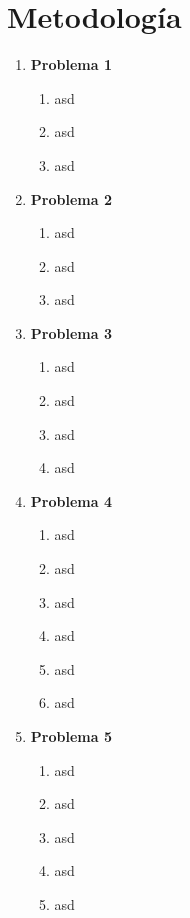 \documentclass[letterpaper, titlepage]{article}
\begin{document}
\section{Metodología}
	\begin{enumerate}
		\item \textbf{Problema 1}
		\begin{enumerate}
			\item asd
			\item asd
			\item asd
		\end{enumerate}
		
		\item \textbf{Problema 2}
		\begin{enumerate}
			\item asd
			\item asd
			\item asd
		\end{enumerate}
		
		\item \textbf{Problema 3}
		\begin{enumerate}
			\item asd
			\item asd
			\item asd
			\item asd
		\end{enumerate}
		
		\item \textbf{Problema 4}
		\begin{enumerate}
			\item asd
			\item asd
			\item asd
			\item asd
			\item asd
			\item asd
		\end{enumerate}
		
		\item \textbf{Problema 5}
		\begin{enumerate}
			\item asd
			\item asd
			\item asd
			\item asd
			\item asd
		\end{enumerate}
	\end{enumerate}
\newpage
\newpage
\end{document}
